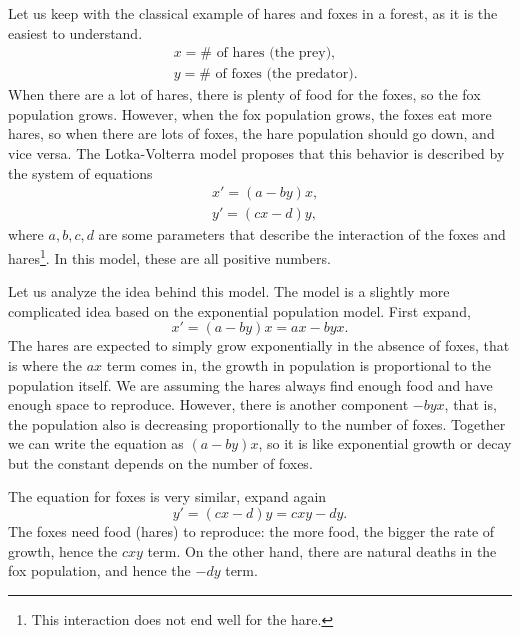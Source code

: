 Let us keep
with the classical example of hares and foxes in a forest, as it is the
easiest to understand.
\begin{equation*}
\begin{aligned}
& x = \# \text{ of hares (the prey),} \\
& y = \# \text{ of foxes (the predator).}
\end{aligned}
\end{equation*}
When there are a lot of hares, there is plenty of food for the foxes, so
the fox population grows.  However, when the fox population grows, the foxes
eat more hares, so when there are lots of foxes, the hare population
should go down, and vice versa.
The Lotka-Volterra model proposes that this 
behavior is described by the system of equations
\begin{equation*}
\begin{aligned}
& x' = (a-by)x, \\
& y' = (cx-d)y,
\end{aligned}
\end{equation*}
where $a,b,c,d$ are some parameters that describe the interaction of the
foxes and hares\footnote{This interaction does not end well for the
hare.}.  In this model, these are all positive numbers.

Let us analyze the idea behind this model.  The model is a slightly more
complicated idea based on the exponential population model.
First expand,
\begin{equation*}
x' = (a-by)x = ax - byx .
\end{equation*}
The hares are expected to simply grow exponentially in the absence of foxes,
that is where the $ax$ term comes in, the growth in population is
proportional to the population itself.  We are assuming the hares
always find enough food and have enough space to reproduce.  However,
there is another component $-byx$, that is, the population also is
decreasing proportionally to the number of foxes.  Together we can write the
equation as $(a-by)x$, so it is like exponential growth or decay but the
constant depends on the number of foxes.

The equation for foxes is very similar, expand again
\begin{equation*}
y' = (cx-d)y = cxy-dy .
\end{equation*}
The foxes need food (hares) to reproduce: the more food, the bigger the
rate of growth, hence the $cxy$ term.  On the other hand, there are 
natural deaths in the fox population, and hence the $-dy$ term.

